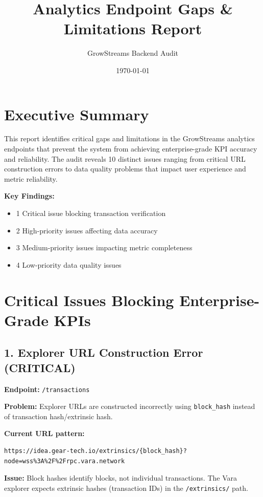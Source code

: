\documentclass[11pt,a4paper]{article}
\title{\textbf{Analytics Endpoint Gaps \& Limitations Report}}
\author{GrowStreams Backend Audit}
\date{\today}
\begin{document}
\maketitle

\tableofcontents
\newpage

\section{Executive Summary}

This report identifies critical gaps and limitations in the GrowStreams analytics endpoints that prevent the system from achieving enterprise-grade KPI accuracy and reliability. The audit reveals 10 distinct issues ranging from critical URL construction errors to data quality problems that impact user experience and metric reliability.

\textbf{Key Findings:}
\begin{itemize}
    \item 1 Critical issue blocking transaction verification
    \item 2 High-priority issues affecting data accuracy
    \item 3 Medium-priority issues impacting metric completeness
    \item 4 Low-priority data quality issues
\end{itemize}

\section{Critical Issues Blocking Enterprise-Grade KPIs}

\subsection{1. Explorer URL Construction Error (CRITICAL)}

\textbf{Endpoint:} \texttt{/transactions}

\textbf{Problem:} Explorer URLs are constructed incorrectly using \texttt{block\_hash} instead of transaction hash/extrinsic hash.

\textbf{Current URL pattern:}
\begin{lstlisting}
https://idea.gear-tech.io/extrinsics/{block_hash}?node=wss%3A%2F%2Frpc.vara.network
\end{lstlisting}

\textbf{Issue:} Block hashes identify blocks, not individual transactions. The Vara explorer expects extrinsic hashes (transaction IDs) in the \texttt{/extrinsics/} path.
\end{document}
